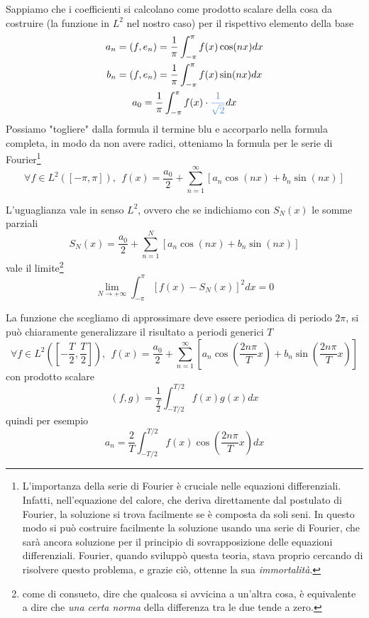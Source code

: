Sappiamo che i coefficienti si calcolano come prodotto scalare della cosa da costruire (la funzione in $L^{2}$ nel nostro caso) per il rispettivo elemento della base
\begin{gather*}
a_{n} = (f, e_{n}) = \frac{1}{\pi}\int^{\pi}_{- \pi} f(x)\cos(nx) dx\\
b_{n} = (f, e_{n}) = \frac{1}{\pi}\int^{\pi}_{- \pi} f(x)\sin(nx) dx\\
a_{0} = \frac{1}{\pi}\int^{\pi}_{- \pi} f(x) \cdot \textcolor[rgb]{0.29, 0.56, 0.89}{\frac{1}{\sqrt{2}}} dx
\end{gather*}
Possiamo "togliere" dalla formula il termine blu e accorparlo nella formula completa, in modo da non avere radici, otteniamo la formula per le serie di Fourier\footnote{L'importanza della serie di Fourier è cruciale nelle equazioni differenziali. Infatti, nell'equazione del calore, che deriva direttamente dal postulato di Fourier, la soluzione si trova facilmente se è composta da soli seni. In questo modo si può costruire facilmente la soluzione usando una serie di Fourier, che sarà ancora soluzione per il principio di sovrapposizione delle equazioni differenziali. Fourier, quando sviluppò questa teoria, stava proprio cercando di risolvere questo problema, e grazie ciò, ottenne la sua \textit{immortalità}.}
\begin{equation*}
\boxed{\forall f\in L^{2}([ - \pi, \pi]), \ \ f(x) = \frac{a_{0}}{2} + \sum\limits^{\infty}_{n = 1}[a_{n}\cos(nx) + b_{n}\sin(nx)]}
\end{equation*}
\begin{rem}
[Convergenza $L^{2}$] L'uguaglianza vale in senso $L^{2}$, ovvero che se indichiamo con $S_{N}(x)$ le somme parziali
\begin{equation*}
S_{N}(x) = \frac{a_{0}}{2} + \sum\limits^{N}_{n = 1}[a_{n}\cos(nx) + b_{n}\sin(nx)]
\end{equation*}
vale il limite\footnote{come di consueto, dire che qualcosa si avvicina a un'altra cosa, è equivalente a dire che \textit{una certa norma} della differenza tra le due tende a zero.}
\begin{equation*}
\lim\limits_{N\rightarrow + \infty}\int^{\pi}_{- \pi}[f(x) - S_{N}(x)]^{2} dx = 0
\end{equation*}
\end{rem}
\begin{rem}
La funzione che scegliamo di approssimare deve essere periodica di periodo $2\pi $, si può chiaramente generalizzare il risultato a periodi generici $T$
\begin{equation*}
\forall f\in L^{2}\left(\left[ - \frac{T}{2}, \frac{T}{2}\right]\right), \ \ f(x) = \frac{a_{0}}{2} + \sum\limits^{\infty}_{n = 1}\left[a_{n}\cos\left(\frac{2n\pi}{T} x\right) + b_{n}\sin\left(\frac{2n\pi}{T} x\right)\right]
\end{equation*}
con prodotto scalare
\begin{equation*}
(f, g) = \frac{1}{\frac{T}{2}}\int^{T/2}_{- T/2} f(x) g(x) dx
\end{equation*}
quindi per esempio
\begin{equation*}
a_{n} = \frac{2}{T}\int^{T/2}_{- T/2} f(x)\cos\left(\frac{2n\pi}{T} x\right) dx
\end{equation*}
\end{rem}
